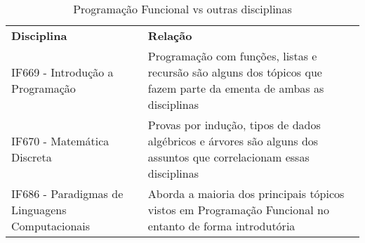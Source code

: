 \documentclass[10pt,twoside,a4paper]{article}
\begin{document}
\begin{table}[h]
 \centering
 {\renewcommand\arraystretch{1.25}
 \caption{Programação Funcional vs outras disciplinas}
 \begin{tabular}{ l l }
  \cline{1-1}\cline{2-2}  


  \\  
  \cline{1-1}\cline{2-2}  
    \multicolumn{1}{|p{3.850cm}|}{\textbf{Disciplina} \centering } &
    \multicolumn{1}{p{4.217cm}|}{\textbf{Relação} \centering }
  \\  
  \cline{1-1}\cline{2-2}  
    \multicolumn{1}{|p{3.850cm}|}{IF669 - Introdução a Programação} &
    \multicolumn{1}{p{4.217cm}|}{Programação com funções, listas e recursão são alguns dos tópicos que fazem parte da ementa de ambas as disciplinas}
  \\  
  \cline{1-1}\cline{2-2}  
    \multicolumn{1}{|p{3.850cm}|}{IF670 - Matemática Discreta} &
    \multicolumn{1}{p{4.217cm}|}{Provas por indução, tipos de dados algébricos e árvores são alguns dos assuntos que correlacionam essas disciplinas}
  \\  
  \cline{1-1}\cline{2-2}  
    \multicolumn{1}{|p{3.850cm}|}{IF686 - Paradigmas de Linguagens Computacionais} &
    \multicolumn{1}{p{4.217cm}|}{Aborda a maioria dos principais tópicos vistos em Programação Funcional no entanto de forma introdutória}
  \\  
  \hline

 \end{tabular} }
\end{table}

			





\cite{thompson2011haskell}
\cite{hudak2000haskell}
\cite{richard1998bird}
\cite{swaine2008s}
\cite{jones2000composing}
\end{document}
